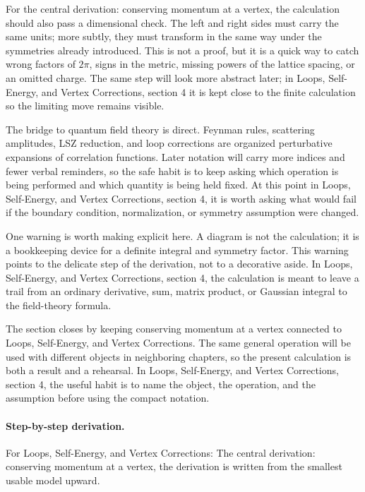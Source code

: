 For the central derivation: conserving momentum at a vertex, the calculation should also pass a dimensional check.  The left and right sides must carry the same units; more subtly, they must transform in the same way under the symmetries already introduced.  This is not a proof, but it is a quick way to catch wrong factors of \(2\pi\), signs in the metric, missing powers of the lattice spacing, or an omitted charge.  The same step will look more abstract later; in Loops, Self-Energy, and Vertex Corrections, section 4 it is kept close to the finite calculation so the limiting move remains visible.

The bridge to quantum field theory is direct.  Feynman rules, scattering amplitudes, LSZ reduction, and loop corrections are organized perturbative expansions of correlation functions.  Later notation will carry more indices and fewer verbal reminders, so the safe habit is to keep asking which operation is being performed and which quantity is being held fixed.  At this point in Loops, Self-Energy, and Vertex Corrections, section 4, it is worth asking what would fail if the boundary condition, normalization, or symmetry assumption were changed.

One warning is worth making explicit here.  A diagram is not the calculation; it is a bookkeeping device for a definite integral and symmetry factor.  This warning points to the delicate step of the derivation, not to a decorative aside.  In Loops, Self-Energy, and Vertex Corrections, section 4, the calculation is meant to leave a trail from an ordinary derivative, sum, matrix product, or Gaussian integral to the field-theory formula.

The section closes by keeping conserving momentum at a vertex connected to Loops, Self-Energy, and Vertex Corrections.  The same general operation will be used with different objects in neighboring chapters, so the present calculation is both a result and a rehearsal.  In Loops, Self-Energy, and Vertex Corrections, section 4, the useful habit is to name the object, the operation, and the assumption before using the compact notation.



\paragraph{Step-by-step derivation.}

For Loops, Self-Energy, and Vertex Corrections: The central derivation: conserving momentum at a vertex, the derivation is written from the smallest usable model upward.

